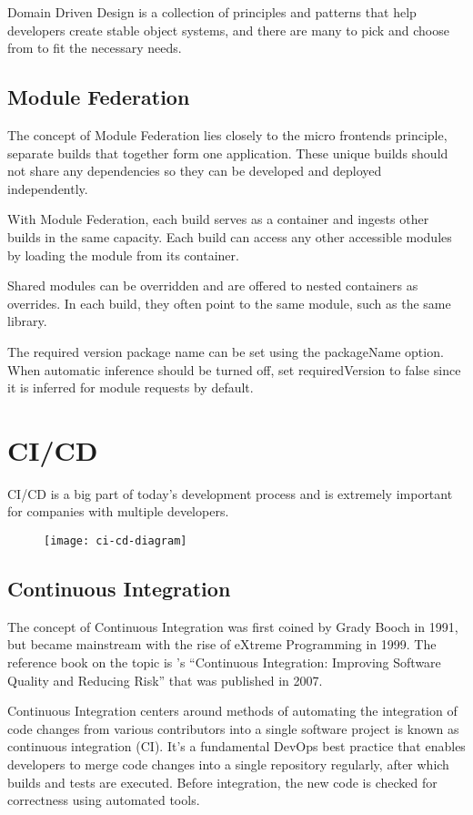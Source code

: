 Domain Driven Design is a collection of principles and patterns that help developers create stable object systems, and there are many to pick and choose from to fit the necessary needs. 
\subsection{Module Federation}
The concept of Module Federation lies closely to the micro frontends principle, separate builds that together form one application. These unique builds should not share any dependencies so they can be developed and deployed independently.

With Module Federation, each build serves as a container and ingests other builds in the same capacity. Each build can access any other accessible modules by loading the module from its container.

Shared modules can be overridden and are offered to nested containers as overrides. In each build, they often point to the same module, such as the same library.

The required version package name can be set using the packageName option. When automatic inference should be turned off, set requiredVersion to false since it is inferred for module requests by default.
\section{CI/CD}
\label{sec:cicd}
CI/CD is a big part of today's development process and is extremely important for companies with multiple developers. 

\begin{figure}[!h]
    \texttt{[image: ci-cd-diagram]}
    \centering
\end{figure}
\subsection{Continuous Integration}
The concept of Continuous Integration was first coined by Grady Booch in 1991, but became mainstream with the rise of eXtreme Programming in 1999. The reference book on the topic is 's ``Continuous Integration: Improving Software Quality and Reducing Risk'' that was published in 2007.

Continuous Integration centers around methods of automating the integration of code changes from various contributors into a single software project is known as continuous integration (CI). It's a fundamental DevOps best practice that enables developers to merge code changes into a single repository regularly, after which builds and tests are executed. Before integration, the new code is checked for correctness using automated tools.

